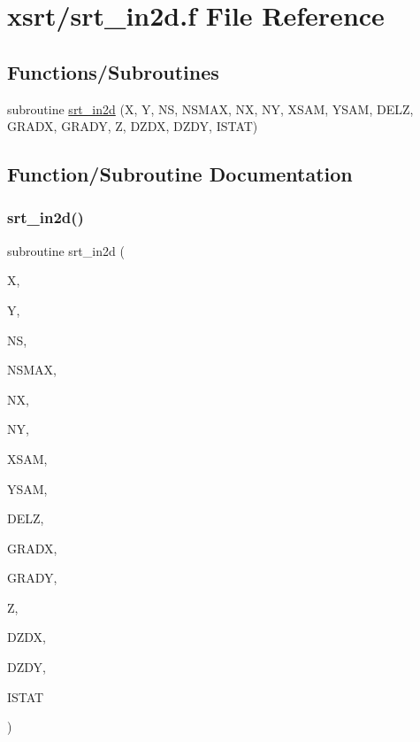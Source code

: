 \hypertarget{srt__in2d_8f}{}\section{xsrt/srt\+\_\+in2d.f File Reference}
\label{srt__in2d_8f}
\subsection*{Functions/\+Subroutines}
\begin{DoxyCompactItemize}
\item 
subroutine \hyperlink{srt__in2d_8f_a5455a358f1d3c2ace2a84fedfe43603d}{srt\+\_\+in2d} (X, Y, NS, N\+S\+M\+AX, NX, NY, X\+S\+AM, Y\+S\+AM, D\+E\+LZ, G\+R\+A\+DX, G\+R\+A\+DY, Z, D\+Z\+DX, D\+Z\+DY, I\+S\+T\+AT)
\end{DoxyCompactItemize}


\subsection{Function/\+Subroutine Documentation}
\mbox{\label{srt__in2d_8f_a5455a358f1d3c2ace2a84fedfe43603d}} 
\subsubsection{\texorpdfstring{srt\+\_\+in2d()}{srt\_in2d()}}
{\footnotesize\ttfamily subroutine srt\+\_\+in2d (\begin{DoxyParamCaption}\item[{double precision}]{X,  }\item[{double precision}]{Y,  }\item[{integer}]{NS,  }\item[{integer}]{N\+S\+M\+AX,  }\item[{integer}]{NX,  }\item[{integer}]{NY,  }\item[{double precision, dimension(nx,nsmax)}]{X\+S\+AM,  }\item[{double precision, dimension(ny,nsmax)}]{Y\+S\+AM,  }\item[{double precision, dimension(nx,ny,nsmax)}]{D\+E\+LZ,  }\item[{double precision, dimension(nx,ny,nsmax)}]{G\+R\+A\+DX,  }\item[{double precision, dimension(nx,ny,nsmax)}]{G\+R\+A\+DY,  }\item[{double precision}]{Z,  }\item[{double precision}]{D\+Z\+DX,  }\item[{double precision}]{D\+Z\+DY,  }\item[{integer}]{I\+S\+T\+AT }\end{DoxyParamCaption})}

